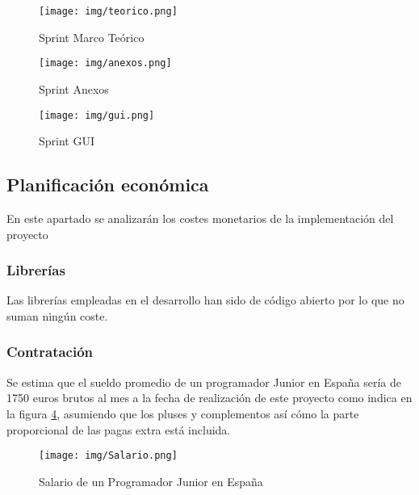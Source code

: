 \begin{figure}[h!]
    \centering
    \texttt{[image: img/teorico.png]}
    \caption{Sprint Marco Teórico}
    \label{fig:teorico}
\end{figure}

\begin{figure}[h!]
    \centering
    \texttt{[image: img/anexos.png]}
    \caption{Sprint Anexos}
    \label{fig:anexos}
\end{figure}

\begin{figure}[h!]
    \centering
    \texttt{[image: img/gui.png]}
    \caption{Sprint GUI}
    \label{fig:gui}
\end{figure}

\FloatBarrier


\subsection{Planificación económica}

En este apartado se analizarán los costes monetarios de la implementación del proyecto

\subsubsection{Librerías}

Las librerías empleadas en el desarrollo han sido de código abierto por lo que no suman ningún coste.

\subsubsection{Contratación}

Se estima que el sueldo promedio de un programador Junior en España sería de 1750 euros brutos al mes a la fecha de realización de este proyecto como indica en la figura \ref{fig:Salario}, asumiendo que los pluses y complementos así cómo la parte proporcional de las pagas extra está incluida. \cite{} %

\begin{figure}[h!]
    \centering
    \texttt{[image: img/Salario.png]}
    \caption{Salario de un Programador Junior en España}
    \label{fig:Salario}
\end{figure}

